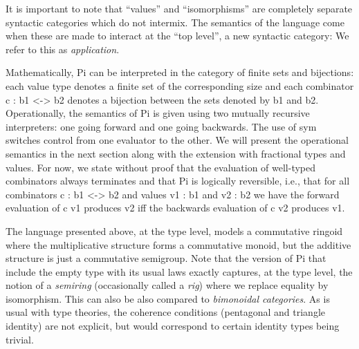\documentclass{llncs}
\newcommand{\jacques}[1]{\textsc{Jacques says:} #1}
\begin{document}
It is important to note that ``values'' and ``isomorphisms'' are 
completely separate syntactic categories which do not intermix.  The 
semantics of the language come when these are made to interact at
the ``top level'', a new syntactic category:
\noindent We refer to this as \emph{application}.



Mathematically, {{Pi}} can be interpreted in the category of finite sets and
bijections: each value type denotes a finite set of the corresponding size
and each combinator {{c : b1 <-> b2}} denotes a bijection between the sets
denoted by {{b1}} and {{b2}}. Operationally, the semantics of {{Pi}} is given
using two mutually recursive interpreters: one going forward and one going
backwards. The use of {{sym}} switches control from one evaluator to the
other. We will present the operational semantics in the next section along
with the extension with fractional types and values. For now, we state
without proof that the evaluation of well-typed combinators always terminates
and that {{Pi}} is logically reversible, i.e., that for all combinators 
{{c : b1 <-> b2}} and values {{v1 : b1}} and {{v2 : b2}} we have the forward
evaluation of {{c v1}} produces {{v2}} iff the backwards evaluation of 
{{c v2}} produces {{v1}}. 


The language presented above, at the type level, models a commutative ringoid
where the multiplicative structure forms a commutative monoid, but the
additive structure is just a commutative semigroup.  Note that the version of
{{Pi}} that include the empty type with its usual laws exactly captures, at
the type level, the notion of a \emph{semiring} (occasionally called a
\emph{rig}) where we replace equality by isomorphism.  This can also be also
compared to \emph{bimonoidal categories}.  As is usual with type theories,
the coherence conditions (pentagonal and triangle identity) are not explicit,
but would correspond to certain identity types being trivial.
\end{document}

